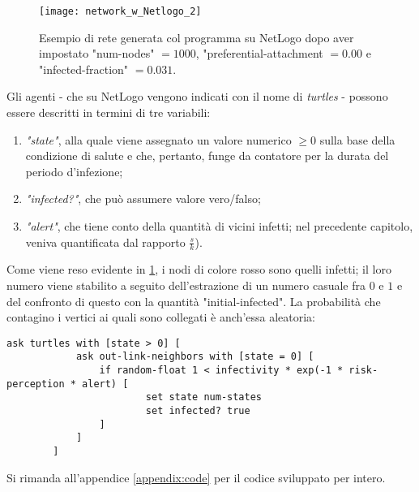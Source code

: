 \begin{figure}[t]
		\begin{center}
			\texttt{[image: network\_w\_Netlogo\_2]}
			\caption{Esempio di rete generata col programma su NetLogo dopo aver impostato "num-nodes" $= 1000 $, "preferential-attachment $= 0.00 $ e "infected-fraction" $= 0.031 $.}
			\label{fig:NetLogo1}
		\end{center}
\end{figure}
Gli agenti - che su NetLogo vengono indicati con il nome di \emph{turtles} - possono essere descritti in termini di tre variabili:
\begin{enumerate}
\item \textit{"state"}, alla quale viene assegnato un valore numerico $ \geq 0 $ sulla base della condizione di salute e che, pertanto, funge da contatore per la durata del periodo d'infezione;
\item \textit{"infected?"}, che può assumere valore vero/falso;
\item \textit{"alert"}, che tiene conto della quantità di vicini infetti; nel precedente capitolo, veniva quantificata dal rapporto $ \tfrac{s}{k}$).
\end{enumerate}
Come viene reso evidente in \cref{fig:NetLogo1}, i nodi di colore rosso sono quelli infetti; il loro numero viene stabilito a seguito dell'estrazione di un numero casuale fra $ 0 $ e $ 1 $ e del confronto di questo con la quantità "initial-infected". La probabilità che contagino i vertici ai quali sono collegati è anch'essa aleatoria:
\begin{center}
	\begin{lstlisting}[autogobble,language={NetLogo},caption={Porzione di codice in cui si mette in luce il meccanismo di infezione.},label={list:infection_prob}]
		ask turtles with [state > 0] [
    		ask out-link-neighbors with [state = 0] [
      			if random-float 1 < infectivity * exp(-1 * risk-perception * alert) [
        				set state num-states
        				set infected? true
      			]
    		]
  		]  
	\end{lstlisting}
\end{center}
Si rimanda all'appendice \ref{appendix:code} per il codice sviluppato per intero.
